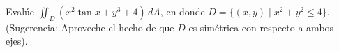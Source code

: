 \item Evalúe $\iint_D (x^2 \tan x + y^3 + 4) \, dA$, en donde $D = \{(x, y) \mid x^2 + y^2 \le 4\}$. (Sugerencia: Aproveche el hecho de que $D$ es simétrica con respecto a ambos ejes).
